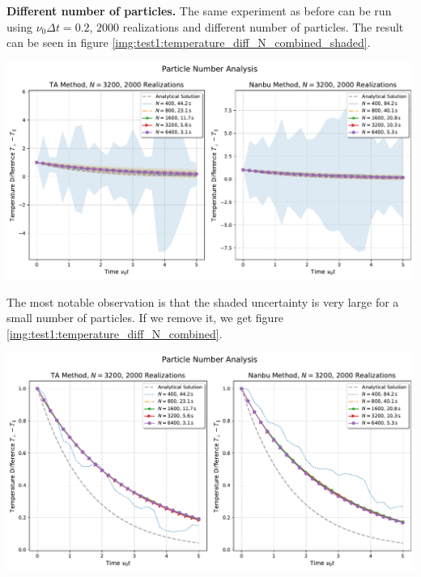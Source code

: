 \textbf{Different number of particles.} The same experiment as before can be run using $\nu_0\Delta t = 0.2$, $2000$ realizations and different number of particles. The result can be seen in figure \ref{img:test1:temperature_diff_N_combined_shaded}. \\
\begin{minipage}[h]{\linewidth}
    \vspace{5pt}
    \centering
    \includegraphics[width=\linewidth]{ressources/test1/temperature_diff_N_combined_shaded.pdf}
    \label{img:test1:temperature_diff_N_combined_shaded}
    \vspace{5pt}
\end{minipage}
The most notable observation is that the shaded uncertainty is very large for a small number of particles. If we remove it, we get figure \ref{img:test1:temperature_diff_N_combined}. \\
\begin{minipage}[h]{\linewidth}
    \vspace{5pt}
    \centering
    \includegraphics[width=\linewidth]{ressources/test1/temperature_diff_N_combined.pdf}
    \label{img:test1:temperature_diff_N_combined}
    \vspace{5pt}
\end{minipage}
